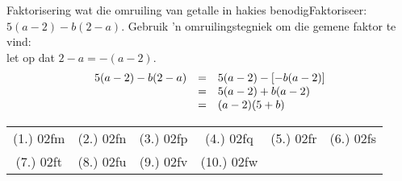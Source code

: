 \begin{wex}{ Faktorisering wat die omruiling van getalle in hakies benodig}{Faktoriseer: $5(a-2)-b(2-a)$. }{
Gebruik 'n omruilingstegniek om die gemene faktor te vind: \\let op dat $2-a = -(a-2)$.
\begin{equation*}
\begin{array}{ccl}
\hfill 5(a-2)-b(2-a)& =& \hfill 5(a-2)-[-b(a-2)]  \\
&= & 5(a-2)+b(a-2)\\ 
& =& (a-2)(5+b) \hfill
\end{array}
\end{equation*}
}
\end{wex}

% 
\par \practiceinfo
\par \begin{tabular}[h]{cccccc}
(1.)	02fm	&
(2.)	02fn	&
(3.)	02fp	&
(4.)	02fq	&
(5.)	02fr	&
(6.)	02fs	\\ %
(7.)	02ft	&
(8.)	02fu	&
(9.)	02fv	&
(10.)	02fw	&
\end{tabular}

